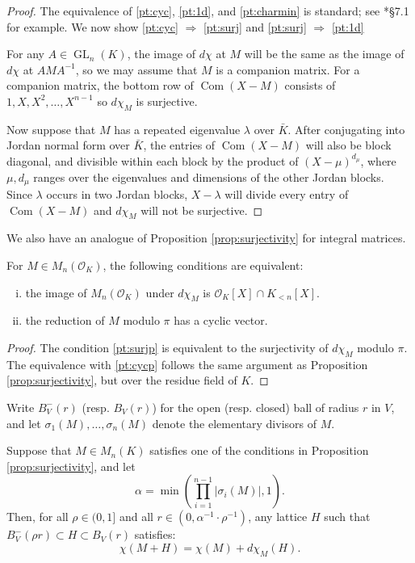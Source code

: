 \documentclass{sig-alternate-05-2015}
\DeclareMathOperator{\GL}{GL}
\DeclareMathOperator{\com}{Com}
\newcommand{\OK}{\mathcal{O}_K}
\begin{document}
\begin{proof}
The equivalence of \eqref{pt:cyc}, \eqref{pt:1d}, and \eqref{pt:charmin} is standard; see
\cite{hoffman-kunze:LinearAlgebra}*{\S 7.1} for example.  We now show
\eqref{pt:cyc} $\Rightarrow$ \eqref{pt:surj} and \eqref{pt:surj} $\Rightarrow$ \eqref{pt:1d}

For any $A \in \GL_n(K)$, the image of $d\chi$ at $M$ will be the same
as the image of $d\chi$ at $AMA^{-1}$, so we may assume that
$M$ is a companion matrix.  For a companion matrix, the bottom row of
$\com(X-M)$ consists of $1, X, X^2, \dots, X^{n-1}$ so $d\chi_M$ is surjective.

Now suppose that $M$ has a repeated eigenvalue $\lambda$ over $\bar{K}$.
After conjugating into Jordan normal form over $\bar{K}$, the entries of $\com(X-M)$
will also be block diagonal, and divisible within each block by the product of $(X-\mu)^{d_\mu}$,
where $\mu, d_\mu$ ranges over the eigenvalues and dimensions of the other Jordan blocks.
Since $\lambda$ occurs in two Jordan blocks,
$X - \lambda$ will divide every entry of $\com(X-M)$ and $d\chi_M$ will not be surjective.
\end{proof}

We also have an analogue of Proposition \ref{prop:surjectivity} for integral matrices.

\begin{prop}
\label{prop:intsurj}
For $M \in M_n(\OK)$, the following conditions are equivalent:
\begin{enumerate}[(i)]
\renewcommand{\itemsep}{0pt}
\item \label{pt:surjp} the image of $M_n(\OK)$ under $d\chi_M$ is $\OK[X] \cap K_{<n}[X]$.
\item \label{pt:cycp} the reduction of $M$ modulo $\pi$ has a cyclic vector.
\end{enumerate}
\end{prop}
\begin{proof}
The condition \eqref{pt:surjp} is equivalent to the surjectivity of $d\chi_M$ modulo $\pi$.  The equivalence with
\eqref{pt:cycp} follows the same argument as Proposition \ref{prop:surjectivity}, but over the residue field of $K$.
\end{proof}

Write $B^-_V(r)$ (resp. $B_V(r)$) for the open (resp. closed) ball of radius $r$ in $V$, and let
$\sigma_1(M), \dots, \sigma_n(M)$ denote the elementary divisors of $M$.

\begin{prop} \label{prop:mainlem}
Suppose that $M \in M_n(K)$ satisfies one of the conditions in Proposition \ref{prop:surjectivity}, and let 
\[
\alpha = \min\left(\prod_{i=1}^{n-1} \left\vert \sigma_i(M) \right\vert, 1\right).
\]
Then, for all $\rho \in (0, 1]$ and all
$r \in (0, \alpha^{-1} \cdot \rho^{-1})$, any lattice $H$ such that $B_V^-(\rho r) \subset H \subset B_V(r)$
satisfies:
\begin{equation}
\chi(M + H) = \chi(M) + d\chi_M(H).
\end{equation}
\end{prop}
\end{document}
